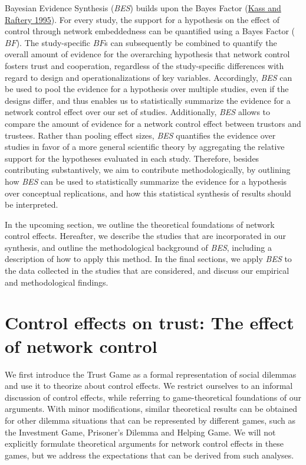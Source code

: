 \documentclass[
  11pt,
]{article}
\begin{document}
Bayesian Evidence Synthesis (\emph{BES}) builds upon the Bayes Factor (\protect\hyperlink{ref-kass_raftery_bayes_factors_1995}{Kass and Raftery 1995}).
For every study, the support for a hypothesis on the effect of control through network embeddedness can be quantified using a Bayes Factor (\(BF\)).
The study-specific \(BF\)s can subsequently be combined to quantify the overall amount of evidence for the overarching hypothesis that network control fosters trust and cooperation, regardless of the study-specific differences with regard to design and operationalizations of key variables.
Accordingly, \emph{BES} can be used to pool the evidence for a hypothesis over multiple studies, even if the designs differ, and thus enables us to statistically summarize the evidence for a network control effect over our set of studies.
Additionally, \emph{BES} allows to compare the amount of evidence for a network control effect between trustors and trustees.
Rather than pooling effect sizes, \emph{BES} quantifies the evidence over studies in favor of a more general scientific theory by aggregating the relative support for the hypotheses evaluated in each study.
Therefore, besides contributing substantively, we aim to contribute methodologically, by outlining how \emph{BES} can be used to statistically summarize the evidence for a hypothesis over conceptual replications, and how this statistical synthesis of results should be interpreted.

In the upcoming section, we outline the theoretical foundations of network control effects.
Hereafter, we describe the studies that are incorporated in our synthesis, and outline the methodological background of \emph{BES}, including a description of how to apply this method.
In the final sections, we apply \emph{BES} to the data collected in the studies that are considered, and discuss our empirical and methodological findings.

\hypertarget{control-effects-on-trust-the-effect-of-network-control}{%
\section{Control effects on trust: The effect of network control}\label{control-effects-on-trust-the-effect-of-network-control}}

We first introduce the Trust Game as a formal representation of social dilemmas and use it to theorize about control effects.
We restrict ourselves to an informal discussion of control effects, while referring to game-theoretical foundations of our arguments.
With minor modifications, similar theoretical results can be obtained for other dilemma situations that can be represented by different games, such as the Investment Game, Prisoner's Dilemma and Helping Game.
We will not explicitly formulate theoretical arguments for network control effects in these games, but we address the expectations that can be derived from such analyses.
\end{document}
